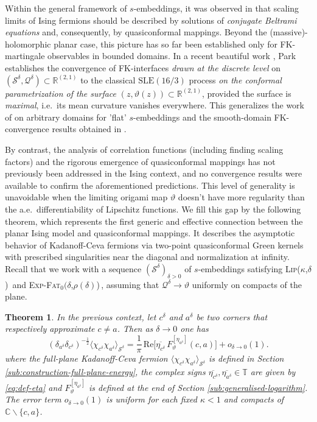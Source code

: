 \documentclass[reqno]{amsart}
\numberwithin{equation}{section}
\newtheorem{theo}{Theorem}[section]
\theoremstyle{definition}
\theoremstyle{remark}
\newcommand\cQ{\mathcal{Q}}
\newcommand\cS{\mathcal{S}}
\def\LipKd{{\mbox{\textsc{Lip(}$\kappa$\textsc{,}$\delta$\textsc{)}}}}
\def\ExpFat{{{\mbox{\textsc{Exp-Fat}$_0(\delta$\textsc{,}$\rho(\delta)$\textsc{)}}}}}
\begin{document}
Within the general framework of $s$-embeddings, it was observed in \cite[Section~2.7]{Che20} that scaling limits of Ising fermions should be described by solutions of \emph{conjugate Beltrami equations} and, consequently, by quasiconformal mappings. Beyond the (massive)-holomorphic planar case, this picture has so far been established only for FK-martingale observables in bounded domains. In a recent beautiful work \cite{Par25}, Park establishes the convergence of FK-interfaces \emph{drawn at the discrete level} on $(\cS^\delta,\cQ^\delta) \subset \mathbb{R}^{(2,1)}$ to the classical $\mathrm{SLE}(16/3)$ process \emph{on the conformal parametrization of the surface} $(z,\vartheta (z)) \subset \mathbb{R}^{(2,1)}$, provided the surface is \emph{maximal}, i.e.\ its mean curvature vanishes everywhere. This generalizes the work of \cite{Che20} on arbitrary domains for 'flat' $s$-embeddings and the smooth-domain FK-convergence results obtained in \cite[Chapter 6]{MahPHD}.

By contrast, the analysis of correlation functions (including finding scaling factors) and the rigorous emergence of quasiconformal mappings has not previously been addressed in the Ising context, and no convergence results were available to confirm the aforementioned  predictions. This level of generality is unavoidable when the limiting origami map $\vartheta $ doesn't have more regularity than the a.e.\ differentiability of Lipschitz functions.  We fill this gap by the following theorem, which represents the first generic and effective connection between the planar Ising model and quasiconformal mappings. It describes the asymptotic behavior of Kadanoff-Ceva fermions via two-point quasiconformal Green kernels with prescribed singularities near the diagonal and normalization at infinity. Recall that we work with a sequence $(\cS^\delta)_{\delta >0} $ of $s$-embeddings satisfying \LipKd\, and \ExpFat\,, assuming that $\cQ^\delta \to \vartheta $ uniformly on compacts of the plane.

\begin{theo}\label{thm:2-points-correlator-convergence}
In the previous context, let $c^\delta $ and $a^\delta$ be two corners that respectively approximate $c\neq a $. Then as $\delta \to 0 $ one has 
\begin{equation}\label{eq:theorem-fermions}
(\delta_{a^{\delta}}\delta_{c^{\delta}})^{-\frac12}
\langle \chi_{c^{\delta}}\chi_{a^{\delta}} \rangle_{\mathcal{S}^{\delta}}
= \frac{1}{\pi}\,\mathrm{Re}\Big[
\overline{\eta_{c^{\delta}}}\, F^{[\eta_{a^{\delta}}]}_{\vartheta}(c,a)
\Big] + o_{\delta\to 0}(1).
\end{equation}
where the full-plane Kadanoff-Ceva fermion $\langle \chi_{c^\delta} \chi_{a^\delta} \rangle_{\cS^\delta} $ is defined in Section \ref{sub:construction-full-plane-energy}, the complex signs $\overline{\eta_{c^\delta}},\overline{\eta_{a^\delta}} \in \mathbb{T}$ are given by \eqref{eq:def-eta} and  $F^{[\eta_{a^\delta}]}_{\vartheta}$ is defined at the end of Section \ref{sub:generalised-logarithm}. The error term $o_{\delta \to 0}(1)$ is uniform for each fixed $\kappa<1$ and compacts of $\mathbb{C}\backslash \{ c,a \}$. 
\end{theo}
\end{document}
